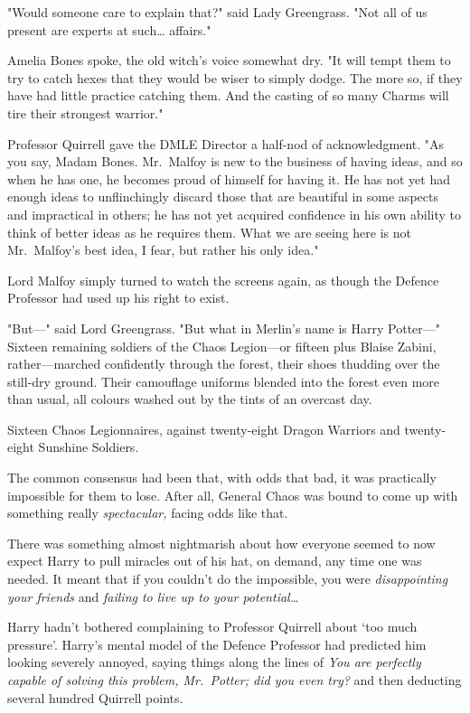"Would someone care to explain that?" said Lady Greengrass. "Not all of us
present are experts at such{\ldots} affairs."

Amelia Bones spoke, the old witch's voice somewhat dry. "It will tempt them to
try to catch hexes that they would be wiser to simply dodge. The more so, if
they have had little practice catching them. And the casting of so many Charms
will tire their strongest warrior."

Professor Quirrell gave the DMLE Director a half-nod of acknowledgment. "As you
say, Madam Bones. Mr.~Malfoy is new to the business of having ideas, and so
when he has one, he becomes proud of himself for having it. He has not yet had
enough ideas to unflinchingly discard those that are beautiful in some aspects
and impractical in others; he has not yet acquired confidence in his own
ability to think of better ideas as he requires them. What we are seeing here
is not Mr.~Malfoy's best idea, I fear, but rather his only idea."

Lord Malfoy simply turned to watch the screens again, as though the Defence
Professor had used up his right to exist.

"But---" said Lord Greengrass. "But what in Merlin's name is Harry Potter---"
\later
Sixteen remaining soldiers of the Chaos Legion---or fifteen plus Blaise Zabini,
rather---marched confidently through the forest, their shoes thudding over the
still-dry ground. Their camouflage uniforms blended into the forest even more
than usual, all colours washed out by the tints of an overcast day.

Sixteen Chaos Legionnaires, against twenty-eight Dragon Warriors and
twenty-eight Sunshine Soldiers.

The common consensus had been that, with odds that bad, it was practically
impossible for them to lose. After all, General Chaos was bound to come up with
something really \emph{spectacular,} facing odds like that.

There was something almost nightmarish about how everyone seemed to now expect
Harry to pull miracles out of his hat, on demand, any time one was needed. It
meant that if you couldn't do the impossible, you were \emph{disappointing your
friends} and \emph{failing to live up to your potential{\ldots}}

Harry hadn't bothered complaining to Professor Quirrell about `too much
pressure'. Harry's mental model of the Defence Professor had predicted him
looking severely annoyed, saying things along the lines of \emph{You are
perfectly capable of solving this problem, Mr.~Potter; did you even try?} and
then deducting several hundred Quirrell points.

